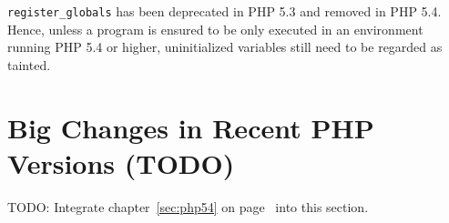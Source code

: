 \texttt{register\_globals} has been deprecated in PHP 5.3 and removed in PHP 5.4.~\cite{php-manual-register-globals} Hence, unless a program is ensured to be only executed in an environment running PHP 5.4 or higher, uninitialized variables still need to be regarded as tainted.


\section{Big Changes in Recent PHP Versions (TODO)}
TODO: Integrate chapter~\ref{sec:php54} on page~\pageref{sec:php54} into this section.
